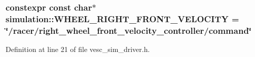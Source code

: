 \subsubsection[{\texorpdfstring{W\+H\+E\+E\+L\+\_\+\+R\+I\+G\+H\+T\+\_\+\+F\+R\+O\+N\+T\+\_\+\+V\+E\+L\+O\+C\+I\+TY}{WHEEL_RIGHT_FRONT_VELOCITY}}]{\setlength{\rightskip}{0pt plus 5cm}constexpr const char$\ast$ simulation\+::\+W\+H\+E\+E\+L\+\_\+\+R\+I\+G\+H\+T\+\_\+\+F\+R\+O\+N\+T\+\_\+\+V\+E\+L\+O\+C\+I\+TY = \char`\"{}/racer/right\+\_\+wheel\+\_\+front\+\_\+velocity\+\_\+controller/command\char`\"{}}\hypertarget{namespacesimulation_aad00b40febd3e9442560a15cd5204a46}{}\label{namespacesimulation_aad00b40febd3e9442560a15cd5204a46}


Definition at line 21 of file vesc\+\_\+sim\+\_\+driver.\+h.

